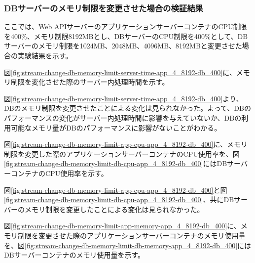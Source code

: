 \documentclass[../../../../main]{subfiles}
\begin{document}
    \subsubsection{DBサーバーのメモリ制限を変更させた場合の検証結果}\label{subsubsec:result-streaming-change-db-memory}

    ここでは、Web APIサーバーのアプリケーションサーバーコンテナのCPU制限を400\%、メモリ制限8192MBとし、DBサーバーのCPU制限を400\%として、DBサーバーのメモリ制限を1024MB、2048MB、4096MB、8192MBと変更させた場合の実験結果を示す。


    図\ref{fig:stream-change-db-memory-limit-server-time-app_4_8192-db_400}に、メモリ制限を変化させた際のサーバー内処理時間を示す。

    

    図\ref{fig:stream-change-db-memory-limit-server-time-app_4_8192-db_400}より、DBのメモリ制限を変更させたことによる変化は見られなかった。よって、DBのパフォーマンスの変化がサーバー内処理時間に影響を与えていないか、DBの利用可能なメモリ量がDBのパフォーマンスに影響がないことがわかる。


    図\ref{fig:stream-change-db-memory-limit-app-cpu-app_4_8192-db_400}に、メモリ制限を変更した際のアプリケーションサーバーコンテナのCPU使用率を、図\ref{fig:stream-change-db-memory-limit-db-cpu-app_4_8192-db_400}にはDBサーバーコンテナのCPU使用率を示す。

    

    

    図\ref{fig:stream-change-db-memory-limit-app-cpu-app_4_8192-db_400}と図\ref{fig:stream-change-db-memory-limit-db-cpu-app_4_8192-db_400}、共にDBサーバーのメモリ制限を変更したことによる変化は見られなかった。


    図\ref{fig:stream-change-db-memory-limit-app-memory-app_4_8192-db_400}に、メモリ制限を変更させた際のアプリケーションサーバーコンテナのメモリ使用量を、図\ref{fig:stream-change-db-memory-limit-db-memory-app_4_8192-db_400}にはDBサーバーコンテナのメモリ使用量を示す。

    

    
\end{document}
